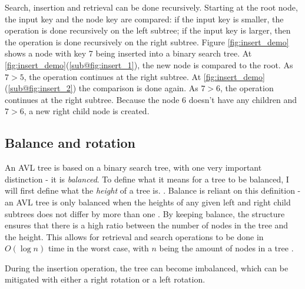 Search, insertion and retrieval can be done recursively. Starting at the root node, the input key and the node key are compared: if the input key is smaller,
the operation is done recursively on the left subtree; if the input key is larger, then the operation is done recursively on the right subtree. Figure \ref{fig:insert_demo} shows 
a node with key 7 being inserted into a binary search tree. At \ref{fig:insert_demo}(\ref{sub@fig:insert_1}), the new node is compared to the root. As $7 > 5$, the operation continues at 
the right subtree. At \ref{fig:insert_demo}(\ref{sub@fig:insert_2}) the comparison is done again. As $7 > 6$, the operation continues at the right subtree. Because the node 6 doesn't have any children and $7 > 6$,
a new right child node is created.

\subsection{Balance and rotation}
An AVL tree is based on a binary search tree, with one very important distinction - it is \textit{balanced}. To define what it means for a tree to be balanced, I will first
define what the \textit{height} of a tree is. . Balance is reliant on this definition - an AVL tree is only balanced when the 
heights of any given left and right child subtrees does not differ by more than one \cite{avl:original}. By keeping balance, the structure ensures that there is a high ratio between the number of 
nodes in the tree and the height. This allows for retrieval and search operations to be done in $O(\log n)$ time in the worst case, with $n$ being the amount of nodes in a tree \cite{avl:computer}.

During the insertion operation, the tree can become imbalanced, which can be mitigated
with either a right rotation or a left rotation. 